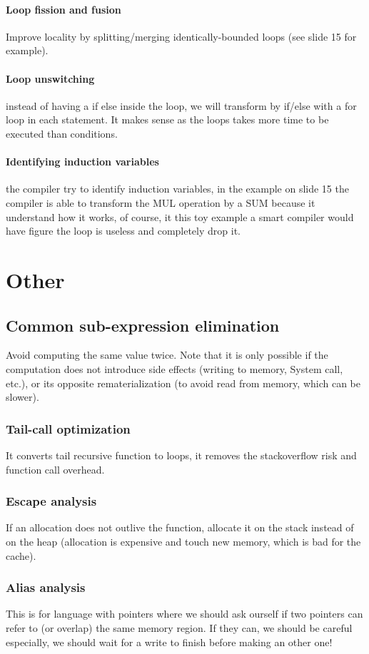 \paragraph{Loop fission and fusion}
Improve locality by splitting/merging identically-bounded loops (see slide 15
for example). \paragraph{Loop unswitching} instead of having a if else inside
the loop, we will transform by if/else with a for loop in each statement. It
makes sense as the loops takes more time to be executed than conditions.
\paragraph{Identifying induction variables} the compiler try to identify
induction variables, in the example on slide 15 the compiler is able to
transform the MUL operation by a SUM because it understand how it works, of
course, it this toy example a smart compiler would have figure the loop is
useless and completely drop it.
\section{Other}
\subsection{Common sub-expression elimination}
Avoid computing the same value twice. Note that it is only possible if the
computation does not introduce side effects (writing to memory, System call,
etc.), or its opposite rematerialization (to avoid read from memory, which can
be slower).
\subsubsection{Tail-call optimization}
It converts tail recursive function to loops, it removes the stackoverflow risk
and function call overhead.
\subsubsection{Escape analysis}
If an allocation does not outlive the function, allocate it on the stack instead
of on the heap (allocation is expensive and touch new memory, which is bad for
the cache).
\subsubsection{Alias analysis}
This is for language with pointers where we should ask ourself if two pointers
can refer to (or overlap) the same memory region. If they can, we should be
careful especially, we should wait for a write to finish before making an other
one!
